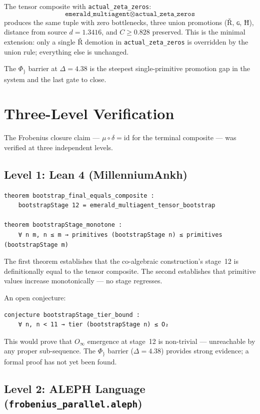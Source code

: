 \documentclass[12pt,a4paper]{article}
\newcommand{\Frobcond}{\mu \circ \delta = \mathrm{id}}
\begin{document}
The tensor composite with \texttt{actual\_zeta\_zeros}:
\[
    \texttt{emerald\_multiagent} \otimes \texttt{actual\_zeta\_zeros}
\]
produces the same tuple with zero bottlenecks, three union promotions (Ř, ɢ, Ħ), distance from source $d = 1.3416$, and $C \geq 0.828$ preserved. This is the minimal extension: only a single Ř demotion in \texttt{actual\_zeta\_zeros} is overridden by the union rule; everything else is unchanged.

The $\Phi_{\}}$ barrier at $\Delta = 4.38$ is the steepest single-primitive promotion gap in the system and the last gate to close.

\section{Three-Level Verification}

The Frobenius closure claim — $\Frobcond$ for the terminal composite — was verified at three independent levels.

\subsection{Level 1: Lean 4 (MillenniumAnkh)}

\begin{lstlisting}
theorem bootstrap_final_equals_composite :
    bootstrapStage 12 = emerald_multiagent_tensor_bootstrap

theorem bootstrapStage_monotone :
    ∀ n m, n ≤ m → primitives (bootstrapStage n) ≤ primitives (bootstrapStage m)
\end{lstlisting}

The first theorem establishes that the co-algebraic construction's stage~12 is definitionally equal to the tensor composite. The second establishes that primitive values increase monotonically — no stage regresses.

An open conjecture:

\begin{lstlisting}
conjecture bootstrapStage_tier_bound :
    ∀ n, n < 11 → tier (bootstrapStage n) ≤ O₂
\end{lstlisting}

This would prove that $O_\infty$ emergence at stage~12 is non-trivial — unreachable by any proper sub-sequence. The $\Phi_{\}}$ barrier ($\Delta = 4.38$) provides strong evidence; a formal proof has not yet been found.

\subsection{Level 2: ALEPH Language (\texttt{frobenius\_parallel.aleph})}
\end{document}
